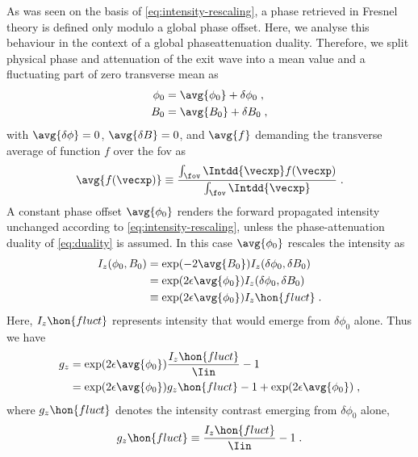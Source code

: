 \documentclass[
twoside,
openright,
titlepage,
numbers=noenddot,
headinclude,
fleqn,
a4paper,
footinclude=true,
cleardoublepage=empty,
abstractoff,
BCOR=5mm,
paper=a4,
fontsize=11pt,
british,ngerman,american,
]{scrreprt}
\begin{document}
As was seen on the basis of \cref{eq:intensity-rescaling}, a phase
retrieved in Fresnel theory is defined only modulo a global phase
offset.  Here, we analyse this behaviour in the context of a global
phase\hyph attenuation duality.  Therefore, we split physical phase
and attenuation of the exit wave into a mean value and a fluctuating
part of zero transverse mean as
\begin{equation}
  \label{eq:mean-plus-var}
  \begin{split}
    \phi_0 &= \avg{\phi_0}+\delta\phi_0 \;,
    \\ B_0 &= \avg{B_0}+\delta B_0 \;,
  \end{split}
\end{equation}
with $\avg{\delta\phi}=0$, $\avg{\delta B}=0$, and $\avg{f}$
demanding the transverse average of function $f$ over the \acf{fov} as
\begin{equation}
  \label{eq:average-fov}
  \avg{f(\vecxp)} \equiv 
  \frac{\int_\fov\Intdd{\vecxp}f(\vecxp)}{\int_\fov\Intdd{\vecxp}} \;.
\end{equation}
A constant phase offset $\avg{\phi_0}$ renders the forward
propagated intensity unchanged according to
\cref{eq:intensity-rescaling}, unless the phase-attenuation duality of
\cref{eq:duality} is assumed.  In this case $\avg{\phi_0}$ rescales
the intensity as
\begin{equation}
  \label{eq:intensity-rescaling-dual}
  \begin{split}
      I_z(\phi_0,B_0) & = \exp(-2\avg{B_0})
      I_z(\delta\phi_0,\delta B_0) 
      \\ & = \exp(2\epsilon\avg{\phi_0})I_z(\delta\phi_0,\delta B_0) 
      \\ & \equiv \exp(2\epsilon\avg{\phi_0})I_z\hon{fluct} \;.
  \end{split}
\end{equation}
Here, $I_z\hon{fluct}$ represents intensity that would emerge from
$\delta\phi_0$ alone.   Thus we have
\begin{equation}
  \label{eq:g-gfluct}
  \begin{split}
    g_z & = \exp(2\epsilon\avg{\phi_0}) \frac{I_z\hon{fluct}}{\Iin} -1
    \\ & = \exp(2\epsilon\avg{\phi_0}) g_z\hon{fluct} -1
    +\exp(2\epsilon\avg{\phi_0}) \;,
  \end{split}
\end{equation}
where $g_z\hon{fluct}$ denotes the intensity contrast emerging from
$\delta\phi_0$ alone,
\begin{equation}
  \label{eq:gfluct}
  g_z\hon{fluct} \equiv \frac{I_z\hon{fluct}}{\Iin} -1 \;.
\end{equation}
\end{document}
